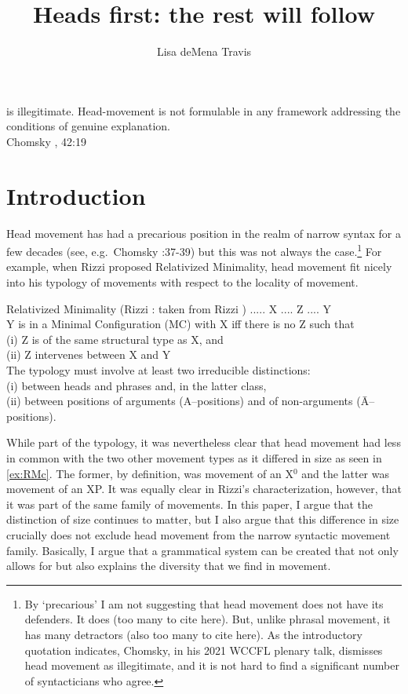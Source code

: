 \documentclass[output=paper,colorlinks,citecolor=brown,
]{langscibook}
\author{Lisa deMena Travis\affiliation{McGill University}\orcid{}}
\title{Heads first: the rest will follow}
\begin{document}
\maketitle


\vspace{1cm}
 is illegitimate.  Head-movement is not formulable in any framework addressing the conditions of genuine explanation.\\
 \hspace*{\fill} Chomsky \citeyear{Chomsky:2021}, 42:19

\section{Introduction}

Head movement has had a precarious position in the realm of narrow syntax for a few decades (see, e.g.\ Chomsky \citeyear{Chomsky:2001a}:37-39) but this was not always the case.\footnote{By `precarious'  I am not suggesting that  head movement does not have its defenders.  It does (too many to cite here).  But, unlike phrasal movement, it has many detractors (also too many to cite here).  As the introductory quotation indicates, Chomsky, in his 2021 WCCFL plenary talk, dismisses head movement as illegitimate, and it is not hard to find a significant number of syntacticians who agree.} For example, when Rizzi proposed Relativized Minimality, head movement fit nicely into his typology of movements with respect to the locality of movement.  

\ea Relativized Minimality (Rizzi \citeyear{Rizzi:1990}: taken from Rizzi \citeyear{Rizzi:2001a})
    \ea ..... X .... Z .... Y\\
    \ex Y is in a Minimal Configuration (MC) with X iff there is no Z such that\\
    (i) Z is of the same structural type as X, and\\
    (ii) Z intervenes between X and Y\\
    \ex The typology must involve at least two irreducible\label{ex:RMc}
    distinctions:\\
    (i) between heads and phrases and, in the latter class,\\
    (ii) between positions of arguments (A--positions) and of non-arguments
    (\=A--positions).
    \z
\z


While part of the typology, it was nevertheless clear that head movement had less in common with the two other movement types as it differed in size as seen in \ref{ex:RMc}. The former, by definition, was movement of an X$^0$ and the latter was movement of an XP.  It was equally clear in Rizzi's characterization, however, that it was part of the same family of movements.  In this paper, I argue that the distinction of size continues to matter, but I also argue that this difference in size crucially does  not exclude head movement from the narrow syntactic movement family.  Basically, I argue that a grammatical system can be created that not only allows for but also explains the diversity that we find in movement.
\end{document}
